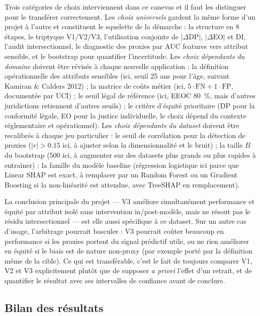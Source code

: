 \documentclass[11pt, a4paper]{article}
\begin{document}
Trois catégories de choix interviennent dans ce canevas et il faut les distinguer pour le transférer correctement. Les \emph{choix universels} gardent la même forme d'un projet à l'autre et constituent le squelette de la démarche : la structure en 8 étapes, le triptyque V1/V2/V3, l'utilisation conjointe de $|\Delta\text{DP}|$, $|\Delta\text{EO}|$ et DI, l'audit intersectionnel, le diagnostic des proxies par AUC features vers attribut sensible, et le bootstrap pour quantifier l'incertitude. Les \emph{choix dépendants du domaine} doivent être révisés à chaque nouvelle application : la définition opérationnelle des attributs sensibles (ici, seuil 25 ans pour l'âge, suivant Kamiran \& Calders 2012) ; la matrice de coûts métier (ici, $5 \cdot \text{FN} + 1 \cdot \text{FP}$, documentée par UCI) ; le seuil légal de référence (ici, EEOC 80~\%, mais d'autres juridictions retiennent d'autres seuils) ; le critère d'équité prioritaire (DP pour la conformité légale, EO pour la justice individuelle, le choix dépend du contexte réglementaire et opérationnel). Les \emph{choix dépendants du dataset} doivent être recalibrés à chaque jeu particulier : le seuil de corrélation pour la détection de proxies ($|r| > 0.15$ ici, à ajuster selon la dimensionnalité et le bruit) ; la taille $B$ du bootstrap (500 ici, à augmenter sur des datasets plus grands ou plus rapides à entraîner) ; la famille du modèle baseline (régression logistique ici parce que Linear SHAP est exact, à remplacer par un Random Forest ou un Gradient Boosting si la non-linéarité est attendue, avec TreeSHAP en remplacement).

La conclusion principale du projet --- V3 améliore simultanément performance et équité par attribut isolé sans intervention in/post-modèle, mais ne résout pas le résidu intersectionnel --- est elle aussi spécifique à ce dataset. Sur un autre cas d'usage, l'arbitrage pourrait basculer : V3 pourrait coûter beaucoup en performance si les proxies portent du signal prédictif utile, ou ne rien améliorer en équité si le biais est de nature non-proxy (par exemple porté par la définition même de la cible). Ce qui est transférable, c'est le fait de toujours comparer V1, V2 et V3 explicitement plutôt que de supposer \emph{a priori} l'effet d'un retrait, et de quantifier le résultat avec ses intervalles de confiance avant de conclure.

\subsection{Bilan des résultats}
\end{document}
